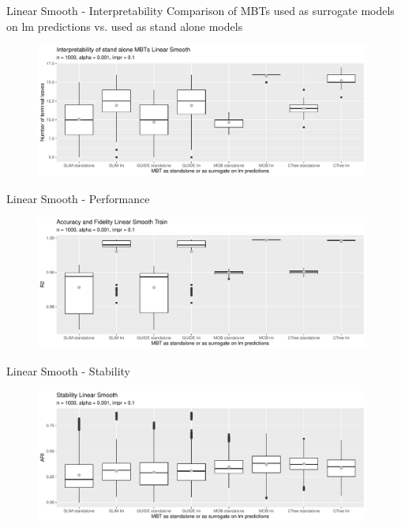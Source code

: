 \documentclass[9pt, xcolor=table]{beamer}
\begin{document}
\begin{frame}{Linear Smooth - Interpretability}
Comparison of MBTs used as surrogate models on lm predictions vs. used as stand alone models 
\begin{figure}
    \includegraphics[width=11cm]{Figures/simulations/batchtools/basic_scenarios/linear_smooth/ls_1000_standalone_lm_int.pdf}
\end{figure}  
\end{frame}

\begin{frame}{Linear Smooth - Performance}
\begin{figure}
    \includegraphics[width=11cm]{Figures/simulations/batchtools/basic_scenarios/linear_smooth/ls_1000_standalone_lm_r2_train.pdf}
\end{figure}  
\end{frame}


\begin{frame}{Linear Smooth - Stability}

\begin{figure}
    \includegraphics[width=11cm]{Figures/simulations/batchtools/basic_scenarios/linear_smooth/ls_1000_standalone_lm_sta.pdf}
\end{figure}  
\end{frame}
\end{document}
